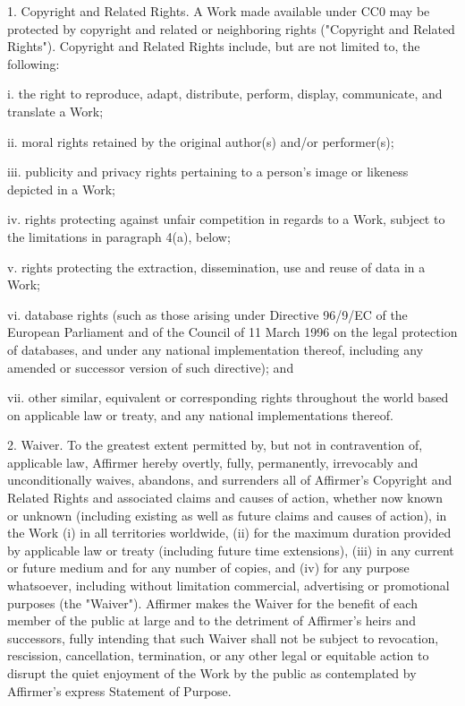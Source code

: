 \documentclass[10pt,letterpaper,twoside]{book}
\begin{document}
1. Copyright and Related Rights. A Work made available under CC0 may be
protected by copyright and related or neighboring rights ("Copyright and
Related Rights"). Copyright and Related Rights include, but are not limited
to, the following:

  i. the right to reproduce, adapt, distribute, perform, display, communicate,
  and translate a Work;

  ii. moral rights retained by the original author(s) and/or performer(s);

  iii. publicity and privacy rights pertaining to a person's image or likeness
  depicted in a Work;

  iv. rights protecting against unfair competition in regards to a Work,
  subject to the limitations in paragraph 4(a), below;

  v. rights protecting the extraction, dissemination, use and reuse of data in
  a Work;

  vi. database rights (such as those arising under Directive 96/9/EC of the
  European Parliament and of the Council of 11 March 1996 on the legal
  protection of databases, and under any national implementation thereof,
  including any amended or successor version of such directive); and

  vii. other similar, equivalent or corresponding rights throughout the world
  based on applicable law or treaty, and any national implementations thereof.

2. Waiver. To the greatest extent permitted by, but not in contravention of,
applicable law, Affirmer hereby overtly, fully, permanently, irrevocably and
unconditionally waives, abandons, and surrenders all of Affirmer's Copyright
and Related Rights and associated claims and causes of action, whether now
known or unknown (including existing as well as future claims and causes of
action), in the Work (i) in all territories worldwide, (ii) for the maximum
duration provided by applicable law or treaty (including future time
extensions), (iii) in any current or future medium and for any number of
copies, and (iv) for any purpose whatsoever, including without limitation
commercial, advertising or promotional purposes (the "Waiver"). Affirmer makes
the Waiver for the benefit of each member of the public at large and to the
detriment of Affirmer's heirs and successors, fully intending that such Waiver
shall not be subject to revocation, rescission, cancellation, termination, or
any other legal or equitable action to disrupt the quiet enjoyment of the Work
by the public as contemplated by Affirmer's express Statement of Purpose.
\end{document}
